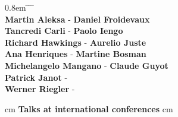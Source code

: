 \documentclass[12pt]{article}
\begin{document}
\begin{tabbing}
\itemsep0.8em
 \hskip 1.3cm  \=   \=  \hskip 1.5cm  \=  \=\\ 
\> {\bf Martin Aleksa}   \> - \> {\bf Daniel Froidevaux}      \\
\> {\bf Tancredi Carli}  \> - \> {\bf Paolo Iengo}   \\
\> {\bf Richard Hawkings}  \> - \> {\bf Aurelio Juste}   \\
\> {\bf Ana Henriques}  \> - \> {\bf Martine Bosman}   \\
\> {\bf Michelangelo Mangano} \> - \> {\bf Claude Guyot}   \\
\> {\bf Patrick Janot}  \> - \\
\> {\bf Werner Riegler}   \> - \\

\end{tabbing}


 cm
{\bf  \large  Talks at international conferences}
 cm
\end{document}
